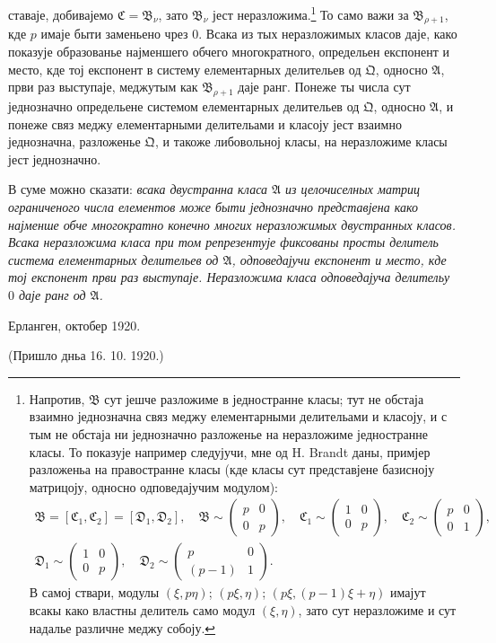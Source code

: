 ﻿\documentclass[11pt]{article}
\begin{document}
ставаје, добивајемо \(\mathfrak C=\mathfrak B_\nu\), зато \(\mathfrak B_\nu\) јест неразложима.\footnote{Напротив, \(\mathfrak B\) сут јешче разложиме в једностранне класы; тут не обстаја взаимно једнозначна связ меджу елементарными делительами и класоју, и с тым не обстаја ни једнозначно разложенье на неразложиме једностранне класы. То показује например следујучи, мне од H. Brandt даны, примјер разложеньа на правостранне класы (кде класы сут представјене базисноју матрицоју, односно одповедајучим модулом):
\[
\begin{gathered}
 \mathfrak B=[\mathfrak C_1,\mathfrak C_2]=[\mathfrak D_1,\mathfrak D_2],\quad
 \mathfrak B\sim\begin{pmatrix}p&0\\0&p\end{pmatrix},\quad
 \mathfrak C_1\sim\begin{pmatrix}1&0\\0&p\end{pmatrix},\quad
 \mathfrak C_2\sim\begin{pmatrix}p&0\\0&1\end{pmatrix},\\
 \mathfrak D_1\sim\begin{pmatrix}1&0\\0&p\end{pmatrix},
 \quad
 \mathfrak D_2\sim\begin{pmatrix}p&0\\(p-1)&1\end{pmatrix}.
\end{gathered}
\]
В самој ствари, модулы \((\xi,p\eta)\); \((p\xi,\eta)\); \((p\xi,(p-1)\xi+\eta)\) имајут всакы како властны делитель само модул \((\xi,\eta)\), зато сут неразложиме и сут надалье различне меджу собоју.} То само важи за \(\mathfrak B_{\rho+1}\), кде \(p\) имаје быти заменьено чрез \(0\). Всака из тых неразложимых класов даје, како показује образованье најменшего обчего многократного, определьен експонент и место, кде тој експонент в систему елементарных делительев од \(\mathfrak Q\), односно \(\mathfrak A\), први раз выступаје, меджутым как \(\mathfrak B_{\rho+1}\) даје ранг. Понеже ты числа сут једнозначно определьене системом елементарных делительев од \(\mathfrak Q\), односно \(\mathfrak A\), и понеже связ меджу елементарными делительами и класоју јест взаимно једнозначна, разложенье \(\mathfrak Q\), и такоже либовольној класы, на неразложиме класы јест једнозначно.

В суме можно сказати: \emph{всака двустранна класа \(\mathfrak A\) из целочиселных матриц ограниченого числа елементов може быти једнозначно представјена како најменше обче многократно конечно многих неразложимых двустранных класов. Всака неразложима класа при том репрезентује фиксованы просты делитель система елементарных делительев од \(\mathfrak A\), одповедајучи експонент и место, кде тој експонент први раз выступаје. Неразложима класа одповедајуча делительу \(0\) даје ранг од \(\mathfrak A\).}

\begin{flushleft}
Ерланген, октобер 1920.
\end{flushleft}
\begin{center}
(Пришло дньа 16. 10. 1920.)
\end{center}
\end{document}
